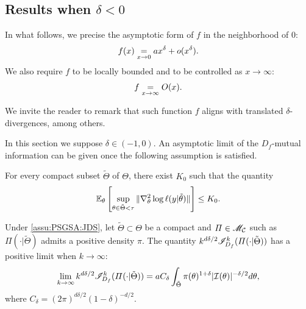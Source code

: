 \subsection{Results when $\delta<0$}

In what follows, we precise the asymptotic form of $f$ in the neighborhood of $0$:
    \begin{equation}
        f(x) \overset{}{\underset{x\rightarrow0}{=}} a x^\delta + o(x^\delta).
    \end{equation}
We also require $f$ to be locally bounded and to be controlled as $x\to\infty$: 
\begin{equation}
    f\overset{}{\underset{x\rightarrow\infty}{=}}O(x).
\end{equation}

We invite the reader to remark that such function $f$ aligns with translated $\delta$-divergences, among others.

In this section we suppose $\delta\in(-1,0)$. 
An asymptotic limit of the $D_f$-mutual information can be given once the following assumption is satisfied.
\begin{assu}
    \label{assu:PSGSA:JDS}
        For every compact subset $\tilde\Theta$ of $\Theta$,
        there exist $K_0$ such that the quantity 
            \begin{equation}
                \mathbb{E}_\theta\left[\sup_{\theta\in\tilde\Theta<\tau}\|\nabla^2_\theta\log\ell(y|\tilde\theta)\|\right] \leq K_0.
            \end{equation}
    \end{assu}


\begin{thm}\label{thm:refcompactneg}
    Under \cref{assu:PSGSA:JDS}, let $\tilde\Theta\subset\Theta$ be a compact and $\varPi\in\mathscr{M}_{\mathcal{C}}$ such as $\varPi(\cdot|\tilde\Theta)$ admits a positive density $\pi$. 
    The quantity $k^{d\delta/2}\mathscr{I}^k_{D_f}(\varPi(\cdot|\tilde\Theta))$ has a positive limit when $k\to\infty$:
    \begin{align}
    \label{eq:limitkbeta}
            \lim_{k\rightarrow\infty} k^{d\delta/2} \mathscr{I}^k_{D_f}(\varPi(\cdot|\tilde\Theta)) = 
    a C_\delta \int_{\tilde\Theta}\pi(\theta)^{1+\delta} |\mathcal{I}(\theta)|^{-\delta/2}  d\theta ,
        \end{align}
    where $ C_\delta = (2\pi)^{d\delta/2} (1-\delta)^{-d/2}$. 
    \end{thm}

